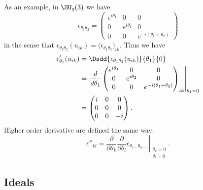 As an example, in $\SU_q(3)$ we have
\begin{equation}
    \epsilon_{\theta_1\theta_2}=
    \begin{pmatrix}
        e^{i\theta_1}    &   0    &   0    \\
        0    &    e^{i\theta_2}    &   0    \\
        0    &   0    &    e^{-i(\theta_1+\theta_2)}
    \end{pmatrix}
\end{equation}
in the sense that $\epsilon_{\theta_1\theta_2}(u_{ik})=\big( \epsilon_{\theta_1\theta_2} \big)_{ik}$. Thus we have
\begin{equation}
    \begin{aligned}[]
        \epsilon'_{\theta_1}(u_{ik})&=\Dsdd{ \epsilon_{\theta_1\theta_2}(u_{ik}) }{\theta_1}{0}\\
        &=\left.\frac{ d }{ d\theta_1 }
        \begin{pmatrix}
            e^{i\theta_1}    &   0    &   0    \\
            0    &    e^{i\theta_2}    &   0    \\
            0    &   0    &    e^{-i(\theta_1+\theta_2)}
        \end{pmatrix}_{ik}\right|_{\theta_1=0}\\
        &=\begin{pmatrix}
            i    &   0    &   0    \\
            0    &   0    &   0    \\
            0    &   0    &   -i
        \end{pmatrix}.
    \end{aligned}
\end{equation}
Higher order derivative are defined the same way:
\begin{equation}
    \epsilon''_{kl}=\left.\frac{ \partial  }{ \partial \theta_k }\frac{ \partial  }{ \partial \theta_l }\epsilon_{\theta_1\ldots\theta_{n-1}}\right|_{\substack{\theta_k=0\\\theta_l=0}}.
\end{equation}

\subsection{Ideals}

